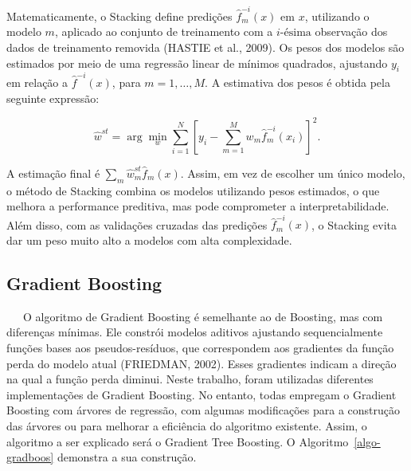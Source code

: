 \documentclass[
  12pt,
  a4paper,
]{scrreprt}
\begin{document}
\vspace{12pt}

Matematicamente, o Stacking define predições
\(\hat{f}_m^{-i}\left(x\right)\) em \(x\), utilizando o modelo \(m\),
aplicado ao conjunto de treinamento com a \(i\text{-ésima}\) observação
dos dados de treinamento removida (HASTIE et al., 2009). Os pesos dos
modelos são estimados por meio de uma regressão linear de mínimos
quadrados, ajustando \(y_i\) em relação a
\(\hat{f}^{-i}\left(x\right)\), para \(m=1,\dots,M\). A estimativa dos
pesos é obtida pela seguinte expressão:

\[
\hat{w}^{st} = \arg \min_{w} \sum^{N}_{i = 1} \left[y_i - \sum^{M}_{m = 1} w_m \hat{f}^{-i}_m\left(x_i\right)\right]^2\text{.}
\]

A estimação final é \(\sum_{m} \hat{w}_m^{st} \hat{f}_m\left(x\right)\).
Assim, em vez de escolher um único modelo, o método de Stacking combina
os modelos utilizando pesos estimados, o que melhora a performance
preditiva, mas pode comprometer a interpretabilidade. Além disso, com as
validações cruzadas das predições \(\hat{f}^{-i}_{m}\left(x\right)\), o
Stacking evita dar um peso muito alto a modelos com alta complexidade.

\subsection{Gradient Boosting}\label{gradient-boosting}

~~~O algoritmo de Gradient Boosting é semelhante ao de Boosting, mas com
diferenças mínimas. Ele constrói modelos aditivos ajustando
sequencialmente funções bases aos pseudos-resíduos, que correspondem aos
gradientes da função perda do modelo atual (FRIEDMAN, 2002). Esses
gradientes indicam a direção na qual a função perda diminui. Neste
trabalho, foram utilizadas diferentes implementações de Gradient
Boosting. No entanto, todas empregam o Gradient Boosting com árvores de
regressão, com algumas modificações para a construção das árvores ou
para melhorar a eficiência do algoritmo existente. Assim, o algoritmo a
ser explicado será o Gradient Tree Boosting. O
 Algoritmo~\ref{algo-gradboos}  demonstra a sua construção.
\end{document}
